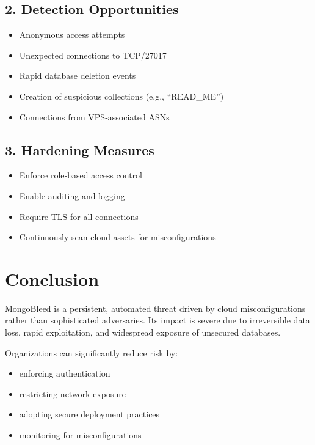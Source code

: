 \documentclass[12pt]{article}
\begin{document}
	\subsection*{2. Detection Opportunities}
	\begin{itemize}
		\item Anonymous access attempts  
		\item Unexpected connections to TCP/27017  
		\item Rapid database deletion events  
		\item Creation of suspicious collections (e.g., “READ\_ME”)  
		\item Connections from VPS‑associated ASNs  
	\end{itemize}
	
	\subsection*{3. Hardening Measures}
	\begin{itemize}
		\item Enforce role‑based access control  
		\item Enable auditing and logging  
		\item Require TLS for all connections  
		\item Continuously scan cloud assets for misconfigurations  
	\end{itemize}
	
	\section{Conclusion}
	
	MongoBleed is a persistent, automated threat driven by cloud misconfigurations rather than sophisticated adversaries.  
	Its impact is severe due to irreversible data loss, rapid exploitation, and widespread exposure of unsecured databases.
	
	Organizations can significantly reduce risk by:
	
	\begin{itemize}
		\item enforcing authentication  
		\item restricting network exposure  
		\item adopting secure deployment practices  
		\item monitoring for misconfigurations  
	\end{itemize}
	
\end{document}
